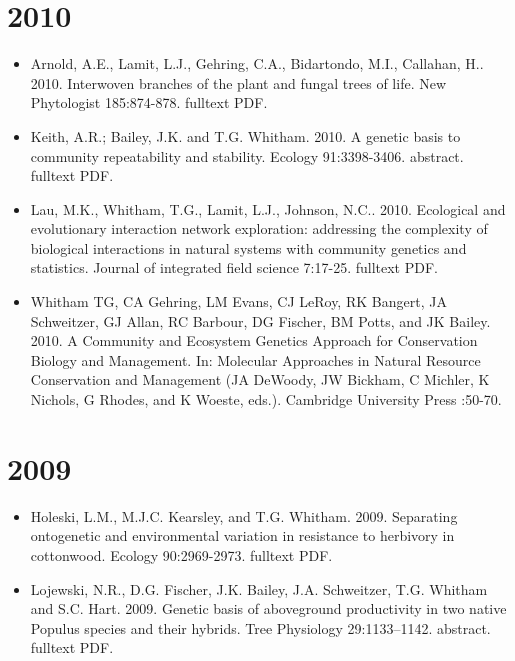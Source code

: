 \documentclass[12pt]{article}
\begin{document}
\section{2010}
\begin{itemize}
\item Arnold, A.E., Lamit, L.J., Gehring, C.A., Bidartondo, M.I., Callahan,
H.. 2010. Interwoven branches of the plant and fungal trees of
life. New Phytologist 185:874-878. fulltext PDF.

\item Keith, A.R.; Bailey, J.K. and T.G. Whitham. 2010. A genetic basis to
community repeatability and stability. Ecology
91:3398-3406. abstract. fulltext PDF.

\item Lau, M.K., Whitham, T.G., Lamit, L.J., Johnson, N.C.. 2010. Ecological
and evolutionary interaction network exploration: addressing the
complexity of biological interactions in natural systems with
community genetics and statistics. Journal of integrated field science
7:17-25. fulltext PDF.

\item Whitham TG, CA Gehring, LM Evans, CJ LeRoy, RK Bangert, JA Schweitzer,
GJ Allan, RC Barbour, DG Fischer, BM Potts, and JK Bailey. 2010. A
Community and Ecosystem Genetics Approach for Conservation Biology and
Management. In: Molecular Approaches in Natural Resource Conservation
and Management (JA DeWoody, JW Bickham, C Michler, K Nichols, G
Rhodes, and K Woeste, eds.). Cambridge University Press :50-70.
 
\end{itemize}

\section{2009}
\begin{itemize}
\item Holeski, L.M., M.J.C. Kearsley, and T.G. Whitham. 2009. Separating
ontogenetic and environmental variation in resistance to herbivory in
cottonwood. Ecology 90:2969-2973. fulltext PDF.

\item Lojewski, N.R., D.G. Fischer, J.K. Bailey, J.A. Schweitzer,
T.G. Whitham and S.C. Hart. 2009. Genetic basis of aboveground
productivity in two native Populus species and their hybrids. Tree
Physiology 29:1133–1142. abstract. fulltext PDF.
 
\end{itemize}
\end{document}
